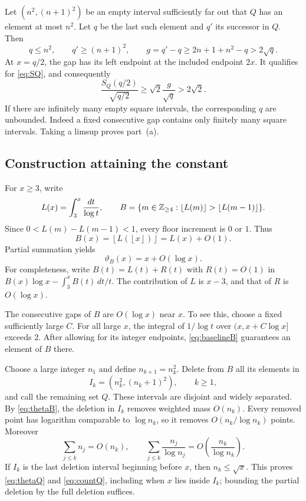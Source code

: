 \documentclass[11pt,a4paper]{article}
\theoremstyle{definition}
\theoremstyle{remark}\newtheorem{remark}[theorem]{Remark}
\newcommand{\floor}[1]{\left\lfloor #1\right\rfloor}
\begin{document}
Let $(n^2,(n+1)^2)$ be an empty interval sufficiently far out that
$Q$ has an element at most $n^2$. Let $q$ be the last such element
and $q'$ its successor in $Q$. Then
\[
 q\le n^2,\qquad q'\ge(n+1)^2,
 \qquad g=q'-q\ge2n+1+n^2-q>2\sqrt q.
\]
At $x=q/2$, the gap has its left endpoint at the included endpoint
$2x$. It qualifies for \eqref{eq:SQ}, and consequently
\begin{equation}\label{eq:firstgap}
 \frac{S_Q(q/2)}{\sqrt{q/2}}
 \ge\sqrt2\frac g{\sqrt q}>2\sqrt2.
\end{equation}
If there are infinitely many empty square intervals, the corresponding
$q$ are unbounded. Indeed a fixed consecutive gap contains only
finitely many square intervals. Taking a limsup proves part~(a).

\subsection{Construction attaining the constant}

For $x\ge3$, write
\[
 L(x)=\int_3^x\frac{dt}{\log t},\qquad
 B=\{m\in\Z_{\ge4}:\floor{L(m)}>\floor{L(m-1)}\}.
\]
Since $0<L(m)-L(m-1)<1$, every floor increment is $0$ or $1$.
Thus
\begin{equation}\label{eq:baselineB}
 B(x)=\floor{L(\floor{x})}=L(x)+O(1).
\end{equation}
Partial summation yields
\begin{equation}\label{eq:thetaB}
 \vartheta_B(x)=x+O(\log x).
\end{equation}
For completeness, write $B(t)=L(t)+R(t)$ with $R(t)=O(1)$ in
$B(x)\log x-\int_3^x B(t)\,dt/t$. The contribution of $L$ is
$x-3$, and that of $R$ is $O(\log x)$.

The consecutive gaps of $B$ are $O(\log x)$ near $x$.
To see this, choose a fixed sufficiently large $C$.
For all large $x$, the integral of $1/\log t$ over
$(x,x+C\log x]$ exceeds $2$. After allowing for its integer
endpoints, \eqref{eq:baselineB} guarantees an element of $B$ there.

Choose a large integer $n_1$ and define $n_{k+1}=n_k^2$. Delete from
$B$ all its elements in
\[
 I_k=(n_k^2,(n_k+1)^2),\qquad k\ge1,
\]
and call the remaining set $Q$. These intervals are disjoint and
widely separated. By \eqref{eq:thetaB}, the deletion in $I_k$ removes
weighted mass $O(n_k)$. Every removed point has logarithm comparable
to $\log n_k$, so it removes $O(n_k/\log n_k)$ points. Moreover
\[
 \sum_{j\le k}n_j=O(n_k),\qquad
 \sum_{j\le k}\frac{n_j}{\log n_j}
 =O\!\left(\frac{n_k}{\log n_k}\right).
\]
If $I_k$ is the last deletion interval beginning before $x$, then
$n_k\le\sqrt x$. This proves \eqref{eq:thetaQ} and
\eqref{eq:countQ}, including when $x$ lies inside $I_k$; bounding
the partial deletion by the full deletion suffices.
\end{document}
